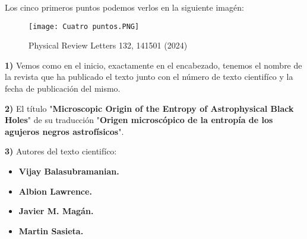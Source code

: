 \documentclass[letterpaper]{article}
\begin{document}
\vspace{\baselineskip}

\begin{justify}

Los cinco primeros puntos podemos verlos en la siguiente imagén:

\end{justify}

\begin{figure}[h]
    \centering
    \texttt{[image: Cuatro puntos.PNG]}
    \caption{Physical Review Letters 132, 141501 (2024)}    
\end{figure}

\vspace{\baselineskip}

\begin{justify}

\textbf{1)} Vemos como en el inicio, exactamente en el encabezado, tenemos el nombre de la revista que ha publicado el texto junto con el número de texto cientifíco
y la fecha de publicación del mismo.
\end{justify}

\vspace{\baselineskip}

\begin{justify}
\textbf{2)} El título "\textbf{Microscopic Origin of the Entropy of Astrophysical Black Holes}" de su traducción "\textbf{Origen microscópico de la entropía de los \; \; agujeros negros astrofísicos}".
\end{justify}

\vspace{\baselineskip}
\begin{justify}
\textbf{3)} Autores del texto cientifíco:
\begin{itemize}
    \item \textbf{Vijay Balasubramanian.}
    \item \textbf{Albion Lawrence.}
    \item \textbf{Javier M. Magán.}
    \item \textbf{Martin Sasieta.}
\end{itemize}   
\end{justify}

\vspace{\baselineskip}
\end{document}

